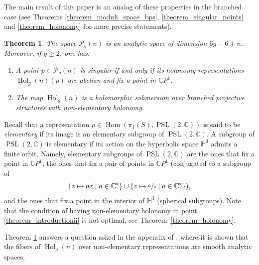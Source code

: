 \documentclass[JEP,XML,SOM,Unicode,NoEqCountersInSection,published]{cedram}
\newcommand{\C}{\mathbb C}
\newcommand{\CP}{\mathbb CP}
\DeclareMathOperator{\Hol}{Hol}
\DeclareMathOperator{\Hom}{Hom}
\DeclareMathOperator{\PSL}{PSL}
\theoremstyle{definition}
\theoremstyle{plain}
\newtheorem{theoremx}{Theorem}
\begin{document}
The main result of this paper is an analog of these properties in the branched case (see Theorems \ref{theorem_moduli_space_bps}, \ref{theorem_singular_points} and \ref{theorem_holonomy} for more precise statements).

\begin{theoremx}\label{theorem_introduction}
The space $\mathcal P_g(n)$ is an analytic space of dimension $6g-6+n$.
Moreover, if $g \ge 2$, one has:
\begin{enumerate}
\item\label{theorem_introductioni}
A point $p \in \mathcal P_g(n)$ is singular if and only if its holonomy representations $\Hol_g(n)(p)$ are abelian and fix a point in $\CP^1$.
\item\label{theorem_introductionii}
The map $\Hol_g(n)$ is a holomorphic submersion over branched projective structures with non-elementary holonomy.
\end{enumerate}
\end{theoremx}

Recall that a representation $\rho \in \Hom(\pi_1(S), \PSL(2, \C))$ is said to be \emph{elementary} if its image is an elementary subgroup of $\PSL(2, \C)$.
A subgroup of $\PSL(2, \C)$ is elementary if its action on the hyperbolic space $\mathbb H^3$ admits a finite orbit.
Namely, elementary subgroups of $\PSL(2, \C)$ are the ones that fix a point in $\CP^1$, the ones that fix a pair of points in $\CP^1$ (conjugated to a subgroup of\vspace*{-3pt}
\[
\{z \mapsto az \mid a \in \C^*\} \cup \{z \mapsto \sfrac a z \mid a \in \C^*\}),
\]
and the ones that fix a point in the interior of $\mathbb H^3$ (spherical subgroups).
Note that the condition of having non-elementary holonomy in point \eqref{theorem_introductionii} is not optimal, see Theorem~\ref{theorem_holonomy}.

Theorem \ref{theorem_introduction} answers a question asked in the appendix of \cite{calsamiglia-deroin-francaviglia}, where it is shown that the fibers of $\Hol_g(n)$ over non-elementary representations are smooth analytic spaces.
\end{document}
